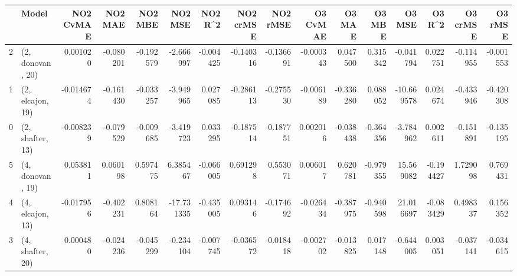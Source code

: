 \begin{tabular}{llrrrrrrrrrrrrrr}
\toprule
{} &             Model &  NO2 CvMAE &   NO2 MAE &   NO2 MBE &    NO2 MSE &   NO2 R\textasciicircum2 &  NO2 crMSE &  NO2 rMSE &  O3 CvMAE &    O3 MAE &    O3 MBE &     O3 MSE &    O3 R\textasciicircum2 &  O3 crMSE &   O3 rMSE \\
\midrule
2 &  (2, donovan, 20) &   0.001020 & -0.080201 & -0.192579 &  -2.666997 & -0.004425 &  -0.140316 & -0.136691 & -0.000343 &  0.047500 &  0.315342 &  -0.041794 &  0.022751 & -0.114955 & -0.001553 \\
1 &  (2, elcajon, 19) &  -0.014674 & -0.161430 & -0.033257 &  -3.949965 &  0.027085 &  -0.286113 & -0.275530 & -0.006189 & -0.336280 &  0.088052 & -10.669578 &  0.024674 & -0.433946 & -0.420308 \\
0 &  (2, shafter, 13) &  -0.008239 & -0.079529 & -0.009685 &  -3.419723 &  0.033295 &  -0.187514 & -0.187751 &  0.002016 & -0.038438 & -0.364356 &  -3.784962 &  0.002611 & -0.151891 & -0.135195 \\
5 &  (4, donovan, 19) &   0.053811 &  0.060198 &  0.597475 &   6.385467 & -0.066005 &   0.691298 &  0.553071 &  0.006017 &  0.620781 & -0.979355 &  15.569082 & -0.194427 &  1.729098 &  0.769431 \\
4 &  (4, elcajon, 13) &  -0.017956 & -0.402231 &  0.808164 & -17.731335 & -0.435005 &   0.093146 & -0.174692 & -0.026434 & -0.387975 & -0.940598 &  21.016697 & -0.083429 &  0.498337 &  0.156352 \\
3 &  (4, shafter, 20) &   0.000480 & -0.024236 & -0.045299 &  -0.234104 & -0.007745 &  -0.036572 & -0.018418 & -0.002702 & -0.013825 &  0.017148 &  -0.644005 &  0.003051 & -0.037141 & -0.034615 \\
\bottomrule
\end{tabular}
